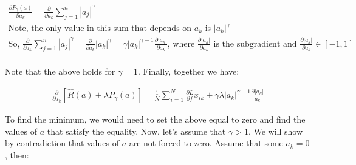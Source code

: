 \documentclass[11pt]{article}
\begin{document}
\begin{gather*}
\frac{\partial P_{\gamma} (a)}{\partial a_{k}} = 
\frac{\partial}{\partial a_{k}} \sum_{j = 1}^{n} |a_{j}|^{\gamma}\\
\text{Note, the only value in this sum that depends on } a_{k} 
\text{ is } |a_{k}|^{\gamma}\\
\text{So, } \frac{\partial}{\partial a_{k}} \sum_{j = 1}^{n} |a_{j}|^{\gamma} = 
\frac{\partial}{\partial a_{k}} |a_{k}|^{\gamma} = 
\gamma |a_{k}|^{\gamma - 1} \frac{\partial |a_{k}|}{\partial a_{k}} 
\text{, where } \frac{\partial |a_{k}|}{\partial a_{k}} 
\text{ is the subgradient and } 
\frac{\partial |a_{k}|}{\partial a_{k}} \in [-1, 1]\\
\end{gather*}

\newpage

\noindent
Note that the above holds for $\gamma = 1$. Finally, together we have:

\begin{gather*}
\frac{\partial}{\partial a_{k}} [\hat{R}(a) + \lambda P_{\gamma}(a)] = 
\frac{1}{N} \sum_{i = 1}^{N} \frac{\partial L}{\partial f} x_{ik} + 
\gamma \lambda |a_{k}|^{\gamma - 1} \frac{\partial |a_{k}|}{a_{k}}
\end{gather*}

\vspace{5mm}
\noindent
To find the minimum, we would need to set the above equal to zero and find the 
values of $a$ that satisfy the equality. Now, let's assume that $\gamma > 1$. 
We will show by contradiction that values of $a$ are not forced to zero. Assume 
that some $a_{k} = 0$, then:
\end{document}
